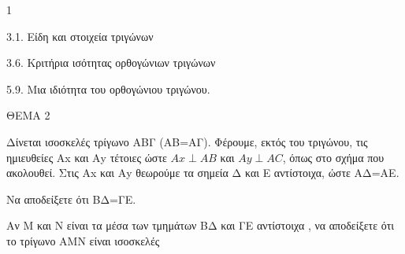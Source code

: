\begin{ylh}{1}
    \item 3.1. Είδη και στοιχεία τριγώνων
    \item 3.6. Κριτήρια ισότητας ορθογώνιων τριγώνων
    \item 5.9. Μια ιδιότητα του ορθογώνιου τριγώνου.
\end{ylh}

ΘΕΜΑ 2

Δίνεται ισοσκελές τρίγωνο ΑΒΓ (ΑΒ=ΑΓ). Φέρουμε, εκτός του τριγώνου, τις ημιευθείες Αx και Αy τέτοιες ώστε $Ax \perp AB$ και $Ay \perp AC$, όπως στο σχήμα που ακολουθεί. Στις Αx και Αy θεωρούμε τα σημεία Δ και Ε αντίστοιχα, ώστε ΑΔ=ΑΕ.

\begin{alist}
\item Να αποδείξετε ότι ΒΔ=ΓΕ. 

\item Αν Μ και Ν είναι τα μέσα των τμημάτων ΒΔ και ΓΕ αντίστοιχα , να αποδείξετε ότι το τρίγωνο ΑΜΝ είναι ισοσκελές 


\begin{center}
\end{center}
\end{alist}

